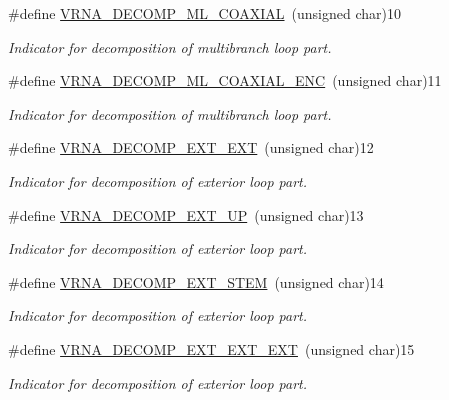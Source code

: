 \begin{DoxyCompactItemize}
\#define \hyperlink{group__constraints_ga4fe48d575830b16c208e280e01ab1497}{V\+R\+N\+A\+\_\+\+D\+E\+C\+O\+M\+P\+\_\+\+M\+L\+\_\+\+C\+O\+A\+X\+I\+AL}~(unsigned char)10
\begin{DoxyCompactList}\small\item\em Indicator for decomposition of multibranch loop part. \end{DoxyCompactList}\item 
\#define \hyperlink{group__constraints_ga0224727f7b8ad2f23eb0a3fd28d8b3fb}{V\+R\+N\+A\+\_\+\+D\+E\+C\+O\+M\+P\+\_\+\+M\+L\+\_\+\+C\+O\+A\+X\+I\+A\+L\+\_\+\+E\+NC}~(unsigned char)11
\begin{DoxyCompactList}\small\item\em Indicator for decomposition of multibranch loop part. \end{DoxyCompactList}\item 
\#define \hyperlink{group__constraints_ga437adf5115c1999304eff26b41e4c9b6}{V\+R\+N\+A\+\_\+\+D\+E\+C\+O\+M\+P\+\_\+\+E\+X\+T\+\_\+\+E\+XT}~(unsigned char)12
\begin{DoxyCompactList}\small\item\em Indicator for decomposition of exterior loop part. \end{DoxyCompactList}\item 
\#define \hyperlink{group__constraints_gaff1ddaffe86d984623910b40cc8a8717}{V\+R\+N\+A\+\_\+\+D\+E\+C\+O\+M\+P\+\_\+\+E\+X\+T\+\_\+\+UP}~(unsigned char)13
\begin{DoxyCompactList}\small\item\em Indicator for decomposition of exterior loop part. \end{DoxyCompactList}\item 
\#define \hyperlink{group__constraints_gae44b5ace0d9b4a29088069ecb4cec441}{V\+R\+N\+A\+\_\+\+D\+E\+C\+O\+M\+P\+\_\+\+E\+X\+T\+\_\+\+S\+T\+EM}~(unsigned char)14
\begin{DoxyCompactList}\small\item\em Indicator for decomposition of exterior loop part. \end{DoxyCompactList}\item 
\#define \hyperlink{group__constraints_ga803bd818b3f4b2b0a4a5cfa2f7dc2045}{V\+R\+N\+A\+\_\+\+D\+E\+C\+O\+M\+P\+\_\+\+E\+X\+T\+\_\+\+E\+X\+T\+\_\+\+E\+XT}~(unsigned char)15
\begin{DoxyCompactList}\small\item\em Indicator for decomposition of exterior loop part. \end{DoxyCompactList}\item 

\end{DoxyCompactItemize}
